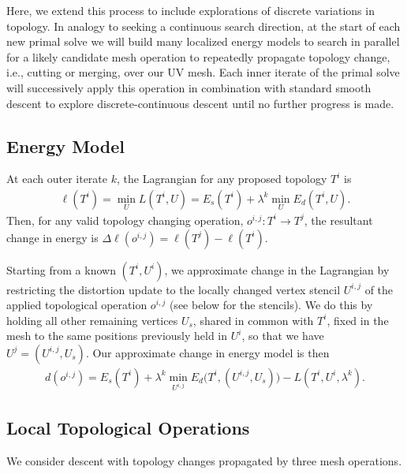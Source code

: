 Here, we extend this process to include explorations of discrete variations in topology. In analogy to seeking a continuous search direction, at the start of each new primal solve we will build many localized energy models to search in parallel for a likely candidate mesh operation to repeatedly propagate topology change, i.e., cutting or merging, over our UV mesh. Each inner iterate of the primal solve will successively apply this operation in combination with standard smooth descent to explore discrete-continuous descent until no further progress is made.%

\subsection{Energy Model}

At each outer iterate $k$, the Lagrangian for any proposed topology $T^i$ is  
\begin{align}
\ell(T^i) = \min_{U} L(T^i, U) = E_s(T^i) + \lambda^k \min_{U} E_d(T^i, U).
\end{align}
Then, for any valid topology changing operation, $o^{i,j}:T^i \rightarrow T^j$, the resultant change in energy is $\Delta \ell(o^{i,j}) = \ell(T^j) - \ell(T^i)$.

Starting from a known $(T^i, U^i)$, we approximate change in the Lagrangian by restricting the distortion update to the locally changed vertex stencil $U^{i,j}$ of the applied topological operation $o^{i,j}$ (see below for the stencils). 
We do this by holding all other remaining vertices $U_s$, shared in common with $T^i$, fixed in the mesh
to the same positions previously held in $U^i$, so that we have $U^j = (U^{i,j}, U_s)$.  Our approximate change in energy model is then 
\begin{align} 
d(o^{i,j}) = E_s(T^i) + \lambda^k \min_{U^{i,j}} E_d \big( T^i, (U^{i,j}, U_s) \big) - L(T^i,U^i,\lambda^k).
\end{align}

\subsection{Local Topological Operations}

We consider descent with topology changes propagated by three mesh operations.

